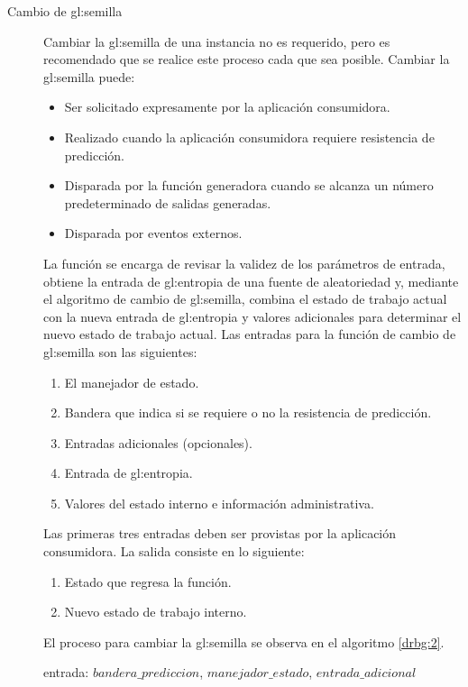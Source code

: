 \begin{description}
  \item [Cambio de \gls{gl:semilla}] Cambiar la \gls{gl:semilla} de una
    instancia no es requerido, pero es recomendado que se realice este proceso
    cada que sea posible. Cambiar la \gls{gl:semilla} puede:
    \begin{itemize}
      \item Ser solicitado expresamente por la aplicación consumidora.
      \item Realizado cuando la aplicación consumidora requiere resistencia de
        predicción.
      \item Disparada por la función generadora cuando se alcanza un número
        predeterminado de salidas generadas. 
      \item Disparada por eventos externos.
    \end{itemize}
    La función se encarga de revisar la validez de los parámetros de entrada,
    obtiene la entrada de \gls{gl:entropia} de una fuente de aleatoriedad y,
    mediante el algoritmo de cambio de \gls{gl:semilla}, combina el estado de
    trabajo actual con la nueva entrada de \gls{gl:entropia} y valores
    adicionales para determinar el nuevo estado de trabajo actual. Las entradas
    para la función de cambio de \gls{gl:semilla} son las siguientes:
    \begin{enumerate}
      \item El manejador de estado.
      \item Bandera que indica si se requiere o no la resistencia de predicción.
      \item Entradas adicionales (opcionales).
      \item Entrada de \gls{gl:entropia}.
      \item Valores del estado interno e información administrativa.
    \end{enumerate}  
    Las primeras tres entradas deben ser provistas por la aplicación
    consumidora. La salida consiste en lo siguiente:
    \begin{enumerate}
      \item Estado que regresa la función.
      \item Nuevo estado de trabajo interno.
    \end{enumerate}
    El proceso para cambiar la \gls{gl:semilla} se observa en el algoritmo 
    \ref{drbg:2}.
    \begin{pseudocodigo}[caption={DRBG, cambio de semilla.}, label={drbg:2}]
      entrada:  $bandera\_prediccion$, $manejador\_estado$, $entrada\_adicional$

\end{pseudocodigo}
\end{description}
